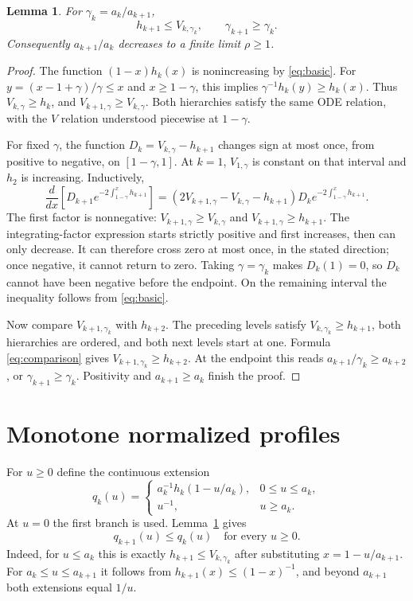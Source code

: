 \documentclass[11pt,a4paper]{article}
\newtheorem{lemma}[theorem]{Lemma}
\theoremstyle{remark}\newtheorem{remark}[theorem]{Remark}
\begin{document}
\begin{lemma}\label{lem:V}
For $\gamma_k=a_k/a_{k+1}$,
\[
h_{k+1}\le V_{k,\gamma_k},\qquad \gamma_{k+1}\ge\gamma_k.
\]
Consequently $a_{k+1}/a_k$ decreases to a finite limit $\rho\ge1$.
\end{lemma}
\begin{proof}
The function $(1-x)h_k(x)$ is nonincreasing by \eqref{eq:basic}. For $y=(x-1+\gamma)/\gamma\le x$ and $x\ge1-\gamma$, this implies
$\gamma^{-1}h_k(y)\ge h_k(x)$. Thus $V_{k,\gamma}\ge h_k$, and $V_{k+1,\gamma}\ge V_{k,\gamma}$. Both hierarchies satisfy the same ODE relation, with the $V$ relation understood piecewise at $1-\gamma$.

For fixed $\gamma$, the function $D_k=V_{k,\gamma}-h_{k+1}$ changes sign at most once, from positive to negative, on $[1-\gamma,1]$. At $k=1$, $V_{1,\gamma}$ is constant on that interval and $h_2$ is increasing. Inductively,
\[
\frac d{dx}\left[D_{k+1}e^{-2\int_{1-\gamma}^x h_{k+1}}
\right]
=(2V_{k+1,\gamma}-V_{k,\gamma}-h_{k+1})D_k
 e^{-2\int_{1-\gamma}^x h_{k+1}}.
\]
The first factor is nonnegative: $V_{k+1,\gamma}\ge V_{k,\gamma}$ and $V_{k+1,\gamma}\ge h_{k+1}$. The integrating-factor expression starts strictly positive and first increases, then can only decrease. It can therefore cross zero at most once, in the stated direction; once negative, it cannot return to zero. Taking $\gamma=\gamma_k$ makes $D_k(1)=0$, so $D_k$ cannot have been negative before the endpoint. On the remaining interval the inequality follows from \eqref{eq:basic}.

Now compare $V_{k+1,\gamma_k}$ with $h_{k+2}$. The preceding levels satisfy $V_{k,\gamma_k}\ge h_{k+1}$, both hierarchies are ordered, and both next levels start at one. Formula \eqref{eq:comparison} gives $V_{k+1,\gamma_k}\ge h_{k+2}$. At the endpoint this reads $a_{k+1}/\gamma_k\ge a_{k+2}$, or $\gamma_{k+1}\ge\gamma_k$. Positivity and $a_{k+1}\ge a_k$ finish the proof.
\end{proof}

\section{Monotone normalized profiles}
For $u\ge0$ define the continuous extension
\begin{equation}\label{eq:q}
q_k(u)=
\begin{cases}
a_k^{-1}h_k(1-u/a_k),&0\le u\le a_k,\\
u^{-1},&u\ge a_k.
\end{cases}
\end{equation}
At $u=0$ the first branch is used. Lemma~\ref{lem:V} gives
\begin{equation}\label{eq:qmono}
q_{k+1}(u)\le q_k(u)\quad\text{for every }u\ge0.
\end{equation}
Indeed, for $u\le a_k$ this is exactly $h_{k+1}\le V_{k,\gamma_k}$ after substituting $x=1-u/a_{k+1}$. For $a_k\le u\le a_{k+1}$ it follows from $h_{k+1}(x)\le(1-x)^{-1}$, and beyond $a_{k+1}$ both extensions equal $1/u$.
\end{document}
